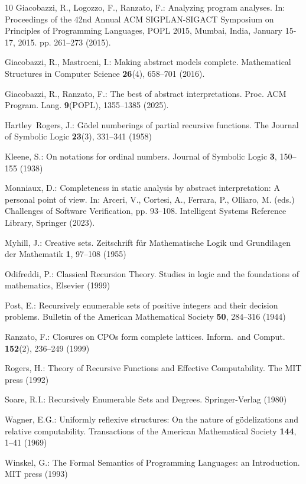 \documentclass[runningheads]{llncs}
\begin{document}
\begin{thebibliography}{10}
Giacobazzi, R., Logozzo, F., Ranzato, F.: Analyzing program analyses. In:
  Proceedings of the 42nd Annual {ACM} {SIGPLAN-SIGACT} Symposium on Principles
  of Programming Languages, {POPL} 2015, Mumbai, India, January 15-17, 2015.
  pp. 261--273 (2015). 

Giacobazzi, R., Mastroeni, I.: Making abstract models complete. Mathematical
  Structures in Computer Science  \textbf{26}(4),  658--701 (2016).

Giacobazzi, R., Ranzato, F.: The best of abstract interpretations. Proc. {ACM}
  Program. Lang.  \textbf{9}({POPL}),  1355--1385 (2025). 

Hartley~Rogers, J.: G\"odel numberings of partial recursive functions. The
  Journal of Symbolic Logic  \textbf{23}(3),  331--341 (1958)

Kleene, S.: On notations for ordinal numbers. Journal of Symbolic Logic
  \textbf{3},  150--155 (1938)

Monniaux, D.: Completeness in static analysis by abstract interpretation: {A}
  personal point of view. In: Arceri, V., Cortesi, A., Ferrara, P., Olliaro, M.
  (eds.) Challenges of Software Verification, pp. 93--108. Intelligent Systems
  Reference Library, Springer (2023). 

Myhill, J.: Creative sets. Zeitschrift f{\"u}r Mathematische Logik und
  Grundilagen der Mathematik  \textbf{1},  97--108 (1955)

Odifreddi, P.: Classical Recursion Theory. Studies in logic and the foundations
  of mathematics, Elsevier (1999)

Post, E.: Recursively enumerable sets of positive integers and their decision
  problems. Bulletin of the American Mathematical Society  \textbf{50},
  284--316 (1944)

Ranzato, F.: Closures on {C}{P}{O}s form complete lattices. Inform.\ and
  Comput.  \textbf{152}(2),  236--249 (1999)

Rogers, H.: Theory of Recursive Functions and Effective Computability. The MIT
  press (1992)

Soare, R.I.: Recursively Enumerable Sets and Degrees. Springer-Verlag (1980)

Wagner, E.G.: Uniformly reflexive structures: On the nature of gödelizations
  and relative computability. Transactions of the American Mathematical Society
   \textbf{144},  1--41 (1969)

Winskel, G.: The Formal Semantics of Programming Languages: an Introduction.
  MIT press (1993)

\end{thebibliography}
\end{document}
